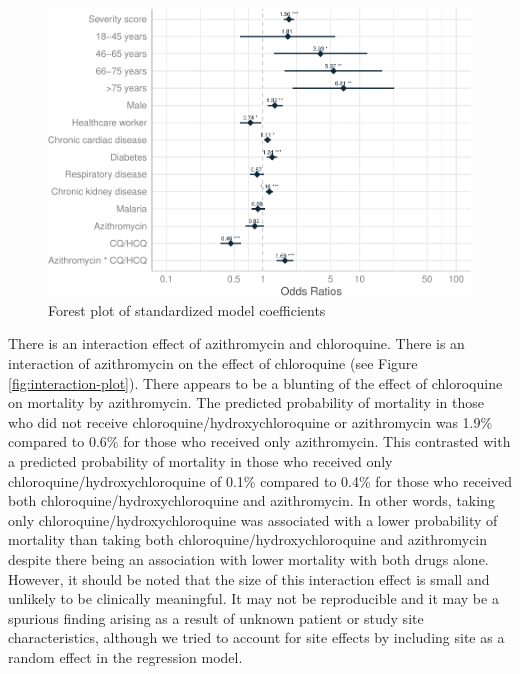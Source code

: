 \documentclass[
  10pt,
]{article}
\begin{document}
\begin{figure}[h]

{\centering \includegraphics{results_files/figure-latex/forest-plot-1} 

}

\caption{Forest plot of standardized model coefficients}\label{fig:forest-plot}
\end{figure}

There is an interaction effect of azithromycin and chloroquine. There is
an interaction of azithromycin on the effect of chloroquine (see Figure
\ref{fig:interaction-plot}). There appears to be a blunting of the
effect of chloroquine on mortality by azithromycin. The predicted
probability of mortality in those who did not receive
chloroquine/hydroxychloroquine or azithromycin was 1.9\% compared to
0.6\% for those who received only azithromycin. This contrasted with a
predicted probability of mortality in those who received only
chloroquine/hydroxychloroquine of 0.1\% compared to 0.4\% for those who
received both chloroquine/hydroxychloroquine and azithromycin. In other
words, taking only chloroquine/hydroxychloroquine was associated with a
lower probability of mortality than taking both
chloroquine/hydroxychloroquine and azithromycin despite there being an
association with lower mortality with both drugs alone. However, it
should be noted that the size of this interaction effect is small and
unlikely to be clinically meaningful. It may not be reproducible and it
may be a spurious finding arising as a result of unknown patient or
study site characteristics, although we tried to account for site
effects by including site as a random effect in the regression model.
\end{document}
